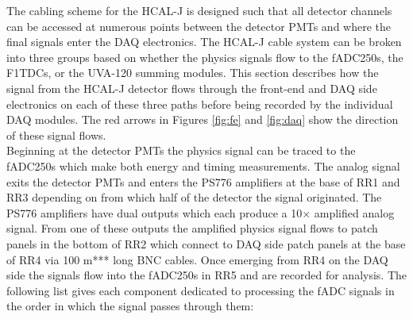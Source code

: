 \documentclass[oneside]{book}   %
\newcommand{\hcal}{HCAL-J\xspace}
\begin{document}
The cabling scheme for the \hcal is designed such that all detector channels can be accessed at numerous points between the detector PMTs and where the final signals enter the DAQ electronics. The \hcal cable system can be broken into three groups based on whether the physics signals flow to the fADC250s, the F1TDCs, or the UVA-120 summing modules. This section describes how the signal from the \hcal detector flows through the front-end and DAQ side electronics on each of these three paths before being recorded by the individual DAQ modules. The red arrows in Figures \ref{fig:fe} and \ref{fig:daq} show the direction of these signal flows.\\ %

Beginning at the detector PMTs the physics signal can be traced to the fADC250s which make both energy and timing measurements. The analog signal exits the detector PMTs and enters the PS776 amplifiers at the base of RR1 and RR3 depending on from which half of the detector the signal originated. The PS776 amplifiers have dual outputs which each produce a 10$\times$ amplified analog signal. From one of these outputs the amplified physics signal flows to patch panels in the bottom of RR2 which connect to DAQ side patch panels at the base of RR4 via 100 m*** long BNC cables. Once emerging from RR4 on the DAQ side the signals flow into the fADC250s in RR5 and are recorded for analysis. The following list gives each component dedicated to processing the fADC signals in the order in which the signal passes through them:\\
\end{document}
